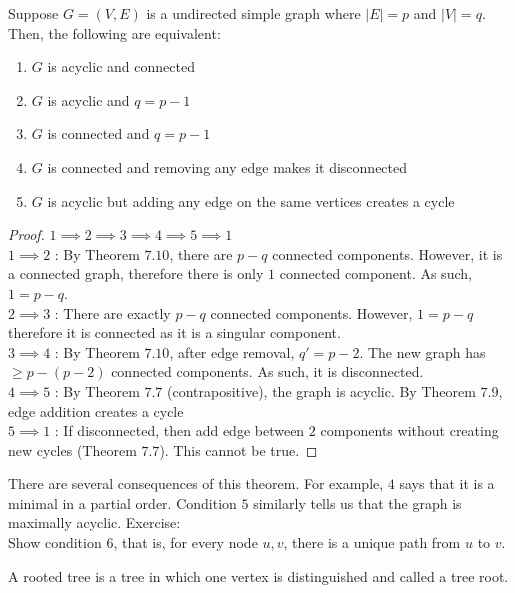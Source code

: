 \documentclass[a4paper]{article}
\theoremstyle{plain}
\newtheorem{thm}{Theorem}[section]
\theoremstyle{definition}
\newtheorem{defn}{Definition}[section]
\theoremstyle{remark}
\begin{document}
\begin{tcolorbox}[colback=black!3!white,colframe=black!60!white,title=\begin{thm}Five definitions of Trees \label{Five definitions of Trees}\end{thm}]
Suppose $G = (V,E)$ is a undirected simple graph where $|E| =p$ and $|V| = q$. Then, the following are equivalent:
	\begin{enumerate}
		\item $G$ is acyclic and connected
		\item $G$ is acyclic and $q=p-1$ 
		\item $G$ is connected and $q=p-1$
		\item $G$ is connected and removing any edge makes it disconnected
		\item $G$ is acyclic but adding any edge on the same vertices creates a cycle
	\end{enumerate}
	\begin{proof}
		$1 \implies 2 \implies 3 \implies 4 \implies 5 \implies 1$ \\
		$1 \implies 2$ : By Theorem $7.10$, there are $p-q$ connected components. However, it is a connected graph, therefore there is only $1$ connected component. As such, $1=p-q$.\\
		$2 \implies 3$ : There are exactly $p-q$ connected components. However, $1 = p-q$ therefore it is connected as it is a singular component. \\
		$3 \implies 4$ : By Theorem $7.10$, after edge removal, $q' = p -2$. The new graph has $\ge p-(p-2)$ connected components. As such, it is disconnected. \\
		$4 \implies 5$ : By Theorem $7.7$ (contrapositive), the graph is acyclic. By Theorem $7.9$, edge addition creates a cycle \\
		$5 \implies 1$ : If disconnected, then add edge between $2$ components without creating new cycles (Theorem $7.7$). This cannot be true. 
	\end{proof}
\end{tcolorbox}
There are several consequences of this theorem. For example, $4$ says that it is a minimal in a partial order. Condition $5$ similarly tells us that the graph is maximally acyclic. Exercise:\\
Show condition $6$, that is, for every node $u,v$, there is a unique path from $u$ to $v$.
\begin{tcolorbox}[colback=black!3!white,colframe=black!60!white,title=\begin{defn}Rooted Trees \label{Rooted Trees}\end{defn}]
A rooted tree is a tree in which one vertex is distinguished and called a tree root.
\end{tcolorbox}
\end{document}
